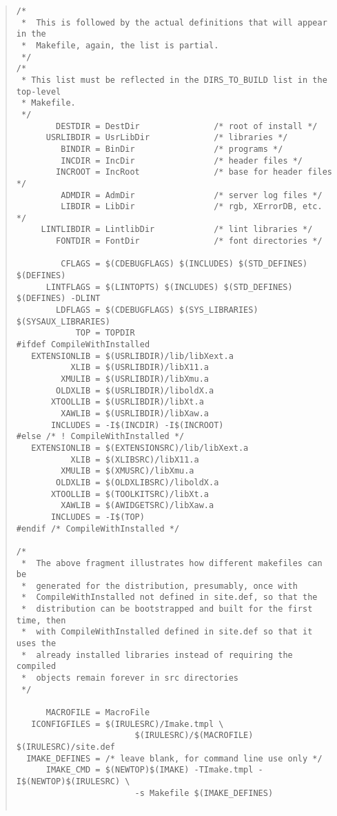 \begin{quote}
\begin{verbatim}
/*
 *  This is followed by the actual definitions that will appear in the
 *  Makefile, again, the list is partial.
 */
/*
 * This list must be reflected in the DIRS_TO_BUILD list in the top-level
 * Makefile.
 */
        DESTDIR = DestDir               /* root of install */
      USRLIBDIR = UsrLibDir             /* libraries */
         BINDIR = BinDir                /* programs */
         INCDIR = IncDir                /* header files */
        INCROOT = IncRoot               /* base for header files */
         ADMDIR = AdmDir                /* server log files */
         LIBDIR = LibDir                /* rgb, XErrorDB, etc. */
     LINTLIBDIR = LintlibDir            /* lint libraries */
        FONTDIR = FontDir               /* font directories */

         CFLAGS = $(CDEBUGFLAGS) $(INCLUDES) $(STD_DEFINES) $(DEFINES)
      LINTFLAGS = $(LINTOPTS) $(INCLUDES) $(STD_DEFINES) $(DEFINES) -DLINT
        LDFLAGS = $(CDEBUGFLAGS) $(SYS_LIBRARIES) $(SYSAUX_LIBRARIES)
            TOP = TOPDIR
#ifdef CompileWithInstalled
   EXTENSIONLIB = $(USRLIBDIR)/lib/libXext.a
           XLIB = $(USRLIBDIR)/libX11.a
         XMULIB = $(USRLIBDIR)/libXmu.a
        OLDXLIB = $(USRLIBDIR)/liboldX.a
       XTOOLLIB = $(USRLIBDIR)/libXt.a
         XAWLIB = $(USRLIBDIR)/libXaw.a
       INCLUDES = -I$(INCDIR) -I$(INCROOT)
#else /* ! CompileWithInstalled */
   EXTENSIONLIB = $(EXTENSIONSRC)/lib/libXext.a
           XLIB = $(XLIBSRC)/libX11.a
         XMULIB = $(XMUSRC)/libXmu.a
        OLDXLIB = $(OLDXLIBSRC)/liboldX.a
       XTOOLLIB = $(TOOLKITSRC)/libXt.a
         XAWLIB = $(AWIDGETSRC)/libXaw.a
       INCLUDES = -I$(TOP)
#endif /* CompileWithInstalled */

/*
 *  The above fragment illustrates how different makefiles can be
 *  generated for the distribution, presumably, once with
 *  CompileWithInstalled not defined in site.def, so that the
 *  distribution can be bootstrapped and built for the first time, then
 *  with CompileWithInstalled defined in site.def so that it uses the
 *  already installed libraries instead of requiring the compiled
 *  objects remain forever in src directories
 */

      MACROFILE = MacroFile
   ICONFIGFILES = $(IRULESRC)/Imake.tmpl \
                        $(IRULESRC)/$(MACROFILE) $(IRULESRC)/site.def 
  IMAKE_DEFINES = /* leave blank, for command line use only */
      IMAKE_CMD = $(NEWTOP)$(IMAKE) -TImake.tmpl -I$(NEWTOP)$(IRULESRC) \
                        -s Makefile $(IMAKE_DEFINES)


\end{verbatim}
\end{quote}
